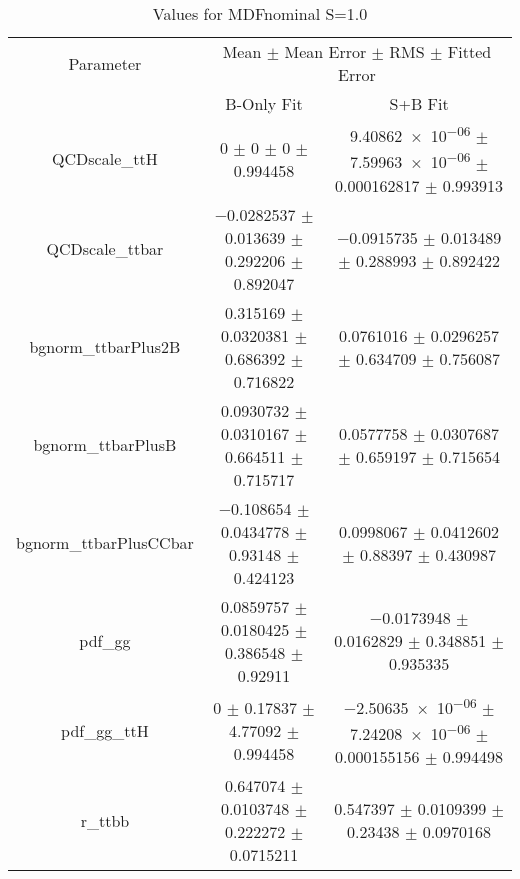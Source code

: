\begin{table}
\centering
\caption{Values for MDFnominal S=1.0}
\begin{tabular}{ccc}
\toprule
Parameter & \multicolumn{2}{c}{Mean $\pm$ Mean Error $\pm$ RMS $\pm$ Fitted Error}\\
 & B-Only Fit & S+B Fit\\
\midrule
QCDscale\_ttH & \num{0} $\pm$ \num{0} $\pm$ \num{0} $\pm$ \num{0.994458} & \num{9.40862e-06} $\pm$ \num{7.59963e-06} $\pm$ \num{0.000162817} $\pm$ \num{0.993913}\\
QCDscale\_ttbar & \num{-0.0282537} $\pm$ \num{0.013639} $\pm$ \num{0.292206} $\pm$ \num{0.892047} & \num{-0.0915735} $\pm$ \num{0.013489} $\pm$ \num{0.288993} $\pm$ \num{0.892422}\\
bgnorm\_ttbarPlus2B & \num{0.315169} $\pm$ \num{0.0320381} $\pm$ \num{0.686392} $\pm$ \num{0.716822} & \num{0.0761016} $\pm$ \num{0.0296257} $\pm$ \num{0.634709} $\pm$ \num{0.756087}\\
bgnorm\_ttbarPlusB & \num{0.0930732} $\pm$ \num{0.0310167} $\pm$ \num{0.664511} $\pm$ \num{0.715717} & \num{0.0577758} $\pm$ \num{0.0307687} $\pm$ \num{0.659197} $\pm$ \num{0.715654}\\
bgnorm\_ttbarPlusCCbar & \num{-0.108654} $\pm$ \num{0.0434778} $\pm$ \num{0.93148} $\pm$ \num{0.424123} & \num{0.0998067} $\pm$ \num{0.0412602} $\pm$ \num{0.88397} $\pm$ \num{0.430987}\\
pdf\_gg & \num{0.0859757} $\pm$ \num{0.0180425} $\pm$ \num{0.386548} $\pm$ \num{0.92911} & \num{-0.0173948} $\pm$ \num{0.0162829} $\pm$ \num{0.348851} $\pm$ \num{0.935335}\\
pdf\_gg\_ttH & \num{0} $\pm$ \num{0.17837} $\pm$ \num{4.77092} $\pm$ \num{0.994458} & \num{-2.50635e-06} $\pm$ \num{7.24208e-06} $\pm$ \num{0.000155156} $\pm$ \num{0.994498}\\
r\_ttbb & \num{0.647074} $\pm$ \num{0.0103748} $\pm$ \num{0.222272} $\pm$ \num{0.0715211} & \num{0.547397} $\pm$ \num{0.0109399} $\pm$ \num{0.23438} $\pm$ \num{0.0970168}\\
\bottomrule
\end{tabular}
\end{table}